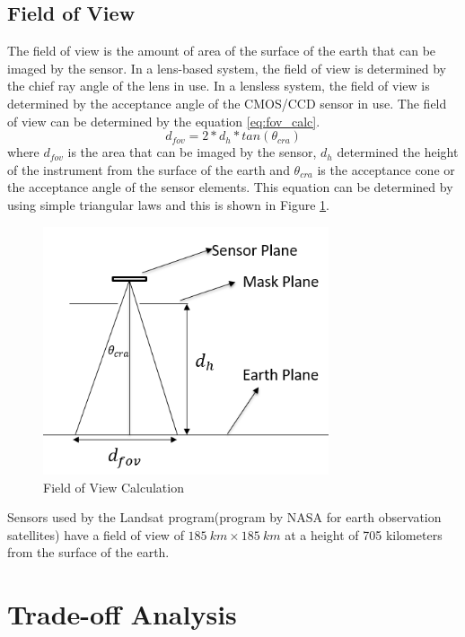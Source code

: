 \subsection{Field of View}
The field of view is the amount of area of the surface of the earth that can be imaged by the sensor. In a lens-based system, the field of view is determined by the chief ray angle of the lens in use. In a lensless system, the field of view is determined by the acceptance angle of the CMOS/CCD sensor in use. The field of view can be determined by the equation \ref{eq:fov_calc}.
\begin{equation}
\label{eq:fov_calc}
d_{fov} = 2*d_h*tan(\theta_{cra})
\end{equation}
where $d_{fov}$ is the area that can be imaged by the sensor, $d_h$ determined the height of the instrument from the surface of the earth and $\theta_{cra}$ is the acceptance cone or the acceptance angle of the sensor elements. This equation can be determined by using simple triangular laws and this is shown in Figure \ref{fig:fov_calc}.
\begin{figure}[htb]
\centering
\includegraphics[width=0.75\textwidth]{pics/fov}
\caption{Field of View Calculation}
\label{fig:fov_calc}
\end{figure}
Sensors used by the Landsat program(program by NASA for earth observation satellites) have a field of view of $185 \ km \times 185 \ km$ at a height of 705 kilometers from the surface of the earth\cite{landsat}.

\section{Trade-off Analysis}
\label{sec:tradeOff}
